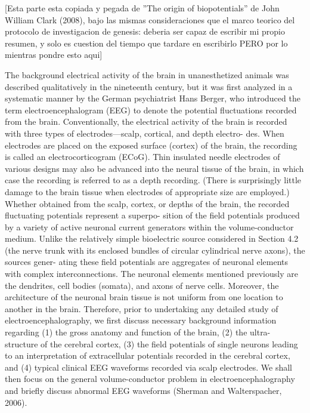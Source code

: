 [Esta parte esta copiada y pegada de ''The origin of biopotentials'' de John William Clark (2008),
bajo las mismas consideraciones que el marco teorico del protocolo de investigacion de genesis:
deberia ser capaz de escribir mi propio resumen, y solo es cuestion del tiempo que tardare en escribirlo
PERO por lo mientras pondre esto aqui]

The background electrical activity of the brain in unanesthetized animals was
described qualitatively in the nineteenth century, but it was first analyzed in a
systematic manner by the German psychiatrist Hans Berger, who introduced
the term electroencephalogram (EEG) to denote the potential fluctuations
recorded from the brain. Conventionally, the electrical activity of the brain is
recorded with three types of electrodes—scalp, cortical, and depth electro-
des. When electrodes are placed on the exposed surface (cortex) of the brain,
the recording is called an electrocorticogram (ECoG). Thin insulated needle
electrodes of various designs may also be advanced into the neural tissue of
the brain, in which case the recording is referred to as a depth recording.
(There is surprisingly little damage to the brain tissue when electrodes of
appropriate size are employed.) Whether obtained from the scalp, cortex, or
depths of the brain, the recorded fluctuating potentials represent a superpo-
sition of the field potentials produced by a variety of active neuronal current
generators within the volume-conductor medium. Unlike the relatively
simple bioelectric source considered in Section 4.2 (the nerve trunk with
its enclosed bundles of circular cylindrical nerve axons), the sources gener-
ating these field potentials are aggregates of neuronal elements with complex
interconnections. The neuronal elements mentioned previously are the
dendrites, cell bodies (somata), and axons of nerve cells. Moreover, the
architecture of the neuronal brain tissue is not uniform from one location to
another in the brain. Therefore, prior to undertaking any detailed study of
electroencephalography, we first discuss necessary background information
regarding (1) the gross anatomy and function of the brain, (2) the ultra-
structure of the cerebral cortex, (3) the field potentials of single neurons
leading to an interpretation of extracellular potentials recorded in the
cerebral cortex, and (4) typical clinical EEG waveforms recorded via scalp
electrodes. We shall then focus on the general volume-conductor problem in
electroencephalography and briefly discuss abnormal EEG waveforms
(Sherman and Walterspacher, 2006).

